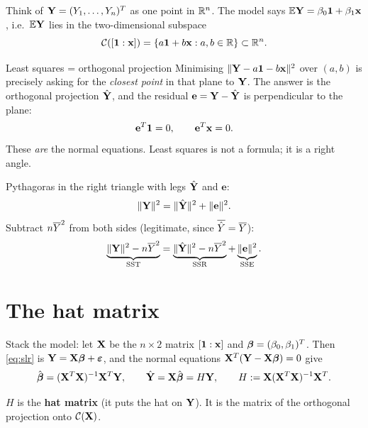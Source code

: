 \documentclass[11pt]{article}
\begin{document}
Think of $\mathbf{Y}=(Y_1,\dots,Y_n)^T$ as one point in $\mathbb{R}^n$. The model says
$\mathbb{E}\mathbf{Y} = \beta_0\mathbf{1} + \beta_1 \mathbf{x}$, i.e.\ $\mathbb{E}\mathbf{Y}$ lies in the two-dimensional
subspace
\[
  \mathcal{C}([\mathbf{1} : \mathbf{x}]) = \{a\mathbf{1} + b\mathbf{x} : a,b\in\mathbb{R}\} \subset \mathbb{R}^n .
\]

\begin{idea}{Least squares = orthogonal projection}
Minimising $\|\mathbf{Y} - a\mathbf{1} - b\mathbf{x}\|^2$ over $(a,b)$ is precisely asking for the
\emph{closest point} in that plane to $\mathbf{Y}$. The answer is the orthogonal projection
$\hat{\mathbf{Y}}$, and the residual $\mathbf{e}=\mathbf{Y}-\hat{\mathbf{Y}}$ is perpendicular to the plane:
\[
  \mathbf{e}^T\mathbf{1} = 0,\qquad \mathbf{e}^T\mathbf{x}=0 .
\]
These \emph{are} the normal equations. Least squares is not a formula; it is a right angle.
\end{idea}

Pythagoras in the right triangle with legs $\hat{\mathbf{Y}}$ and $\mathbf{e}$:
\[
  \|\mathbf{Y}\|^2 = \|\hat{\mathbf{Y}}\|^2 + \|\mathbf{e}\|^2 .
\]
Subtract $n\overline{Y}^2$ from both sides (legitimate, since $\overline{\hat Y}=\overline{Y}$):
\[
  \underbrace{\|\mathbf{Y}\|^2-n\overline{Y}^2}_{\mathrm{SST}}
  = \underbrace{\|\hat{\mathbf{Y}}\|^2-n\overline{Y}^2}_{\mathrm{SSR}} + \underbrace{\|\mathbf{e}\|^2}_{\mathrm{SSE}} .
\]

\section{The hat matrix}\label{sec:matrix}

Stack the model: let $\mathbf{X}$ be the $n\times 2$ matrix $[\mathbf{1} : \mathbf{x}]$ and
$\boldsymbol{\beta}=(\beta_0,\beta_1)^T$. Then \eqref{eq:slr} is $\mathbf{Y} = \mathbf{X}\boldsymbol{\beta}+\boldsymbol{\varepsilon}$, and the normal
equations $\mathbf{X}^T(\mathbf{Y}-\mathbf{X}\boldsymbol{\beta})=0$ give
\[
  \hat{\boldsymbol{\beta}} = (\mathbf{X}^T\mathbf{X})^{-1}\mathbf{X}^T\mathbf{Y}, \qquad
  \hat{\mathbf{Y}} = \mathbf{X}\hat{\boldsymbol{\beta}} = H\mathbf{Y}, \qquad H := \mathbf{X}(\mathbf{X}^T\mathbf{X})^{-1}\mathbf{X}^T .
\]

$H$ is the \textbf{hat matrix} (it puts the hat on $\mathbf{Y}$). It is the matrix of the
orthogonal projection onto $\mathcal{C}(\mathbf{X})$.
\end{document}
